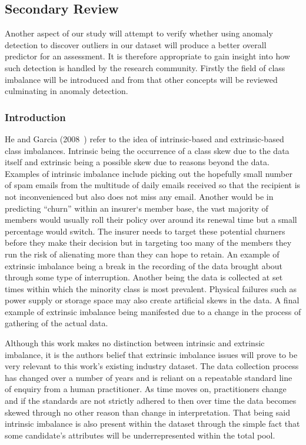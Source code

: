 \subsection{Secondary Review}

Another aspect of our study will attempt to verify whether using anomaly detection to discover outliers in our dataset will produce a better overall predictor for an assessment. It is therefore appropriate to gain insight into how such detection is handled by the research community. Firstly the field of class imbalance will be introduced and from that other concepts will be reviewed culminating in anomaly detection.

\subsubsection{Introduction}

He and Garcia (2008~\cite{he2008learning}) refer to the idea of intrinsic-based and extrinsic-based class imbalances. Intrinsic being the occurrence of a class skew due to the data itself and extrinsic being a possible skew due to reasons beyond the data. Examples of intrinsic imbalance include picking out the hopefully small number of spam emails from the multitude of daily emails received so that the recipient is not inconvenienced but also does not miss any email. Another would be in predicting ``churn'' within an insurer`s member base, the vast majority of members would usually roll their policy over around its renewal time but a small percentage would switch. The insurer needs to target these potential churners before they make their decision but in targeting too many of the members they run the risk of alienating more than they can hope to retain. An example of extrinsic imbalance being a break in the recording of the data brought about through some type of interruption. Another being the data is collected at set times within which the minority class is most prevalent. Physical failures such as power supply or storage space may also create artificial skews in the data. A final example of extrinsic imbalance being manifested due to a change in the process of gathering of the actual data.
\par
Although this work makes no distinction between intrinsic and extrinsic imbalance, it is the authors belief that extrinsic imbalance issues will prove to be very relevant to this work's existing industry dataset. The data collection process has changed over a number of years and is reliant on a repeatable standard line of enquiry from a human practitioner. As time moves on, practitioners change and if the standards are not strictly adhered to then over time the data becomes skewed through no other reason than change in interpretation. That being said intrinsic imbalance is also present within the dataset through the simple fact that some candidate's attributes will be underrepresented within the total pool.

